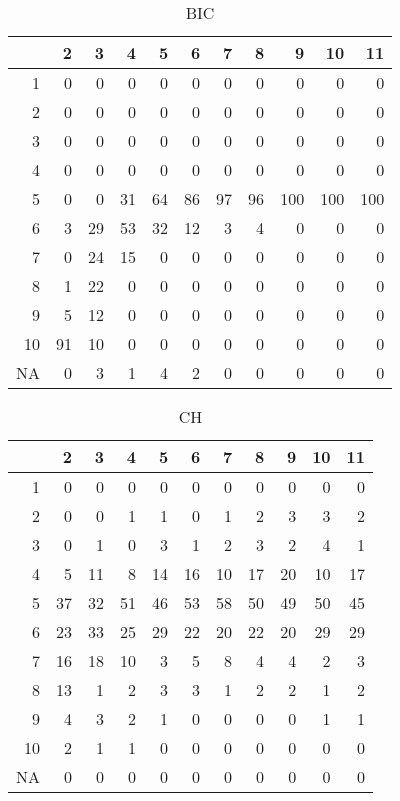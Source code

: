 \documentclass[11pt]{article}
\begin{document}
\begin{table}[H]
\centering
\begin{tabular}{rrrrrrrrrrr}
  \hline
 & 2 & 3 & 4 & 5 & 6 & 7 & 8 & 9 & 10 & 11 \\ 
  \hline
1 & 0 & 0 & 0 & 0 & 0 & 0 & 0 & 0 & 0 & 0 \\ 
  2 & 0 & 0 & 0 & 0 & 0 & 0 & 0 & 0 & 0 & 0 \\ 
  3 & 0 & 0 & 0 & 0 & 0 & 0 & 0 & 0 & 0 & 0 \\ 
  4 & 0 & 0 & 0 & 0 & 0 & 0 & 0 & 0 & 0 & 0 \\ 
  5 & 0 & 0 & 31 & 64 & 86 & 97 & 96 & 100 & 100 & 100 \\ 
  6 & 3 & 29 & 53 & 32 & 12 & 3 & 4 & 0 & 0 & 0 \\ 
  7 & 0 & 24 & 15 & 0 & 0 & 0 & 0 & 0 & 0 & 0 \\ 
  8 & 1 & 22 & 0 & 0 & 0 & 0 & 0 & 0 & 0 & 0 \\ 
  9 & 5 & 12 & 0 & 0 & 0 & 0 & 0 & 0 & 0 & 0 \\ 
  10 & 91 & 10 & 0 & 0 & 0 & 0 & 0 & 0 & 0 & 0 \\ 
  NA & 0 & 3 & 1 & 4 & 2 & 0 & 0 & 0 & 0 & 0 \\ 
   \hline
\end{tabular}
\caption{BIC} 
\end{table}
\begin{table}[H]
\centering
\begin{tabular}{rrrrrrrrrrr}
  \hline
 & 2 & 3 & 4 & 5 & 6 & 7 & 8 & 9 & 10 & 11 \\ 
  \hline
1 & 0 & 0 & 0 & 0 & 0 & 0 & 0 & 0 & 0 & 0 \\ 
  2 & 0 & 0 & 1 & 1 & 0 & 1 & 2 & 3 & 3 & 2 \\ 
  3 & 0 & 1 & 0 & 3 & 1 & 2 & 3 & 2 & 4 & 1 \\ 
  4 & 5 & 11 & 8 & 14 & 16 & 10 & 17 & 20 & 10 & 17 \\ 
  5 & 37 & 32 & 51 & 46 & 53 & 58 & 50 & 49 & 50 & 45 \\ 
  6 & 23 & 33 & 25 & 29 & 22 & 20 & 22 & 20 & 29 & 29 \\ 
  7 & 16 & 18 & 10 & 3 & 5 & 8 & 4 & 4 & 2 & 3 \\ 
  8 & 13 & 1 & 2 & 3 & 3 & 1 & 2 & 2 & 1 & 2 \\ 
  9 & 4 & 3 & 2 & 1 & 0 & 0 & 0 & 0 & 1 & 1 \\ 
  10 & 2 & 1 & 1 & 0 & 0 & 0 & 0 & 0 & 0 & 0 \\ 
  NA & 0 & 0 & 0 & 0 & 0 & 0 & 0 & 0 & 0 & 0 \\ 
   \hline
\end{tabular}
\caption{CH} 
\end{table}
\end{document}
